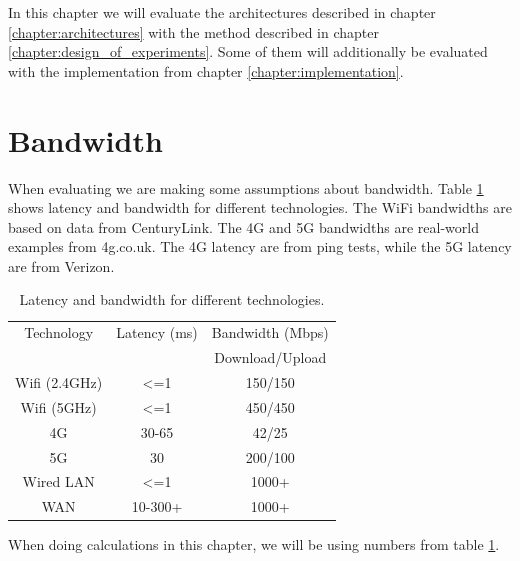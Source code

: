 In this chapter we will evaluate the architectures described in chapter \ref{chapter:architectures} with the method described in chapter \ref{chapter:design_of_experiments}. Some of them will additionally be evaluated with the implementation from chapter \ref{chapter:implementation}.







\section{Bandwidth}
When evaluating we are making some assumptions about bandwidth. Table \ref{tab:Bandwidth_latency} shows latency and bandwidth for different technologies. The WiFi bandwidths are based on data from CenturyLink\cite{noauthor_24_nodate}. The 4G and 5G bandwidths are real-world examples from 4g.co.uk\cite{noauthor_how_nodate}. The 4G latency are from ping tests, while the 5G latency are from Verizon\cite{noauthor_what_2020}.

\begin{table}[h!]
    \centering
    \begin{tabular}[c]{|c|c|c|}
        \hline
        Technology & Latency (ms) & Bandwidth (Mbps) \\
            &   &  Download/Upload \\
        \hline
        \hline
        Wifi (2.4GHz) & <=1 & 150/150  \\
        \hline
        Wifi (5GHz) & <=1 & 450/450  \\
        \hline
        4G & 30-65 & 42/25  \\
        \hline
        5G & 30 & 200/100  \\
        \hline
        Wired LAN & <=1 & 1000+  \\
        \hline
        WAN & 10-300+ & 1000+  \\
        \hline
        
        
    \end{tabular}
    \caption{Latency and bandwidth for different technologies.}
    \label{tab:Bandwidth_latency}
\end{table}
When doing calculations in this chapter, we will be using numbers from table \ref{tab:Bandwidth_latency}.









